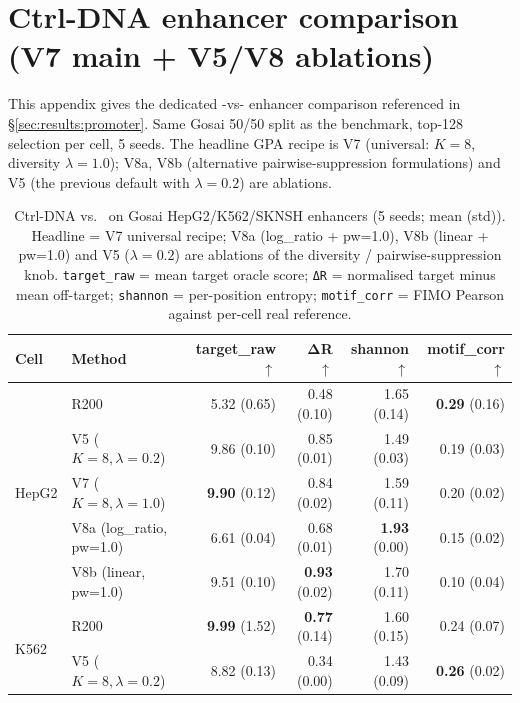 \section{Ctrl-DNA enhancer comparison (V7 main + V5/V8 ablations)}\label{app:ctrldna_enhancer}

This appendix gives the dedicated \ctrldna{}-vs-\gpa{} enhancer comparison referenced in \S\ref{sec:results:promoter}. Same Gosai 50/50 split as the \dnacraft{} benchmark, top-128 selection per cell, 5 \gpa{} seeds. The headline GPA recipe is V7 (universal: $K\!=\!8$, diversity $\lambda\!=\!1.0$); V8a, V8b (alternative pairwise-suppression formulations) and V5 (the previous default with $\lambda\!=\!0.2$) are ablations.

\begin{table}[h]
\caption{Ctrl-DNA vs.\ \gpa{} on Gosai HepG2/K562/SKNSH enhancers (5 seeds; mean (std)). Headline = V7 universal recipe; V8a (log\_ratio + pw=1.0), V8b (linear + pw=1.0) and V5 ($\lambda\!=\!0.2$) are ablations of the diversity / pairwise-suppression knob. \texttt{target\_raw} = mean target oracle score; \texttt{ΔR} = normalised target minus mean off-target; \texttt{shannon} = per-position entropy; \texttt{motif\_corr} = FIMO Pearson against per-cell real reference.}
\label{tab:ctrldna_enhancer}
\centering
\footnotesize
\setlength{\tabcolsep}{4pt}
\begin{tabular}{llrrrr}
\toprule
Cell & Method & target\_raw $\uparrow$ & ΔR $\uparrow$ & shannon $\uparrow$ & motif\_corr $\uparrow$ \\
\midrule
\multirow{5}{*}{HepG2}
 & \ctrldna{} R200             & 5.32 (0.65) & 0.48 (0.10) & 1.65 (0.14) & \textbf{0.29} (0.16) \\
 & \gpa{} V5 ($K\!=\!8, \lambda\!=\!0.2$) & 9.86 (0.10) & 0.85 (0.01) & 1.49 (0.03) & 0.19 (0.03) \\
 & \gpa{} V7 ($K\!=\!8, \lambda\!=\!1.0$) & \textbf{9.90} (0.12) & 0.84 (0.02) & 1.59 (0.11) & 0.20 (0.02) \\
 & \gpa{} V8a (log\_ratio, pw=1.0) & 6.61 (0.04) & 0.68 (0.01) & \textbf{1.93} (0.00) & 0.15 (0.02) \\
 & \gpa{} V8b (linear, pw=1.0) & 9.51 (0.10) & \textbf{0.93} (0.02) & 1.70 (0.11) & 0.10 (0.04) \\
\midrule
\multirow{5}{*}{K562}
 & \ctrldna{} R200             & \textbf{9.99} (1.52) & \textbf{0.77} (0.14) & 1.60 (0.15) & 0.24 (0.07) \\
 & \gpa{} V5 ($K\!=\!8, \lambda\!=\!0.2$) & 8.82 (0.13) & 0.34 (0.00) & 1.43 (0.09) & \textbf{0.26} (0.02) \\

\end{tabular}
\end{table}
